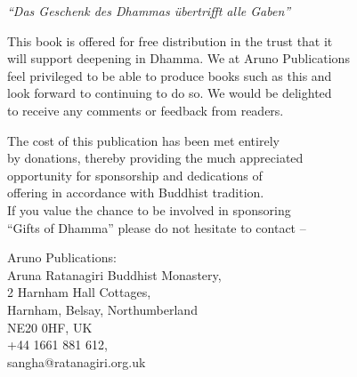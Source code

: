 {\smaller\centering


\emph{“Das Geschenk des Dhammas übertrifft alle Gaben”}\\[0.2\baselineskip]

This book is offered for free distribution in the trust that it\\
will support deepening in Dhamma. We at Aruno Publications\\
feel privileged to be able to produce books such as this and\\
look forward to continuing to do so. We would be delighted\\
to receive any comments or feedback from readers.

The cost of this publication has been met entirely\\
by donations, thereby providing the much appreciated\\
opportunity for sponsorship and dedications of\\
offering in accordance with Buddhist tradition.\\
If you value the chance to be involved in sponsoring\\
“Gifts of Dhamma” please do not hesitate to contact  --

Aruno Publications:\\
Aruna Ratanagiri Buddhist Monastery,\\
2 Harnham Hall Cottages,\\
Harnham, Belsay, Northumberland\\
NE20 0HF, UK\\
+44 1661 881 612,\\
sangha@ratanagiri.org.uk

}


